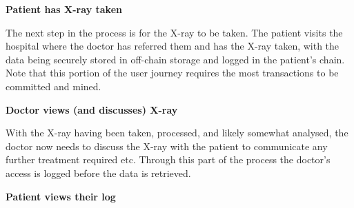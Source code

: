 

\textbf{Patient has X-ray taken}

The next step in the process is for the X-ray to be taken. The patient visits the hospital where the doctor has referred them and has the X-ray taken, with the data being securely stored in off-chain storage and logged in the patient's chain. Note that this portion of the user journey requires the most transactions to be committed and mined.



\textbf{Doctor views (and discusses) X-ray}

With the X-ray having been taken, processed, and likely somewhat analysed, the doctor now needs to discuss the X-ray with the patient to communicate any further treatment required etc. Through this part of the process the doctor's access is logged before the data is retrieved.



\textbf{Patient views their log}




